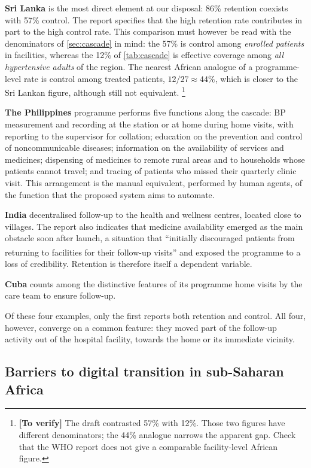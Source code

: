 \documentclass[12pt,a4paper,oneside]{report}
\newcommand{\verify}[1]{\footnote{\textbf{[To verify]} #1}}
\newcommand{\bq}[1]{``#1''\textsuperscript{\dag}}
\begin{document}
\textbf{Sri Lanka} is the most direct element at our disposal: 86\% retention coexists with 57\% control. The report specifies that the high retention rate contributes in part to the high control rate. This comparison must however be read with the denominators of \cref{sec:cascade} in mind: the 57\% is control among \emph{enrolled patients} in facilities, whereas the 12\% of \cref{tab:cascade} is effective coverage among \emph{all hypertensive adults} of the region. The nearest African analogue of a programme-level rate is control among treated patients, $12/27 \approx 44\%$, which is closer to the Sri Lankan figure, although still not equivalent.%
\verify{The draft contrasted 57\% with 12\%. Those two figures have different denominators; the 44\% analogue narrows the apparent gap. Check that the WHO report does not give a comparable facility-level African figure.}

\textbf{The Philippines} programme performs five functions along the cascade: BP measurement and recording at the station or at home during home visits, with reporting to the supervisor for collation; education on the prevention and control of noncommunicable diseases; information on the availability of services and medicines; dispensing of medicines to remote rural areas and to households whose patients cannot travel; and tracing of patients who missed their quarterly clinic visit. This arrangement is the manual equivalent, performed by human agents, of the function that the proposed system aims to automate.

\textbf{India} decentralised follow-up to the health and wellness centres, located close to villages. The report also indicates that medicine availability emerged as the main obstacle soon after launch, a situation that \bq{initially discouraged patients from returning to facilities for their follow-up visits} and exposed the programme to a loss of credibility. Retention is therefore itself a dependent variable.

\textbf{Cuba} counts among the distinctive features of its programme home visits by the care team to ensure follow-up.

Of these four examples, only the first reports both retention and control. All four, however, converge on a common feature: they moved part of the follow-up activity out of the hospital facility, towards the home or its immediate vicinity.

\subsection{Barriers to digital transition in sub-Saharan Africa}\label{sec:digital-barriers}
\end{document}
